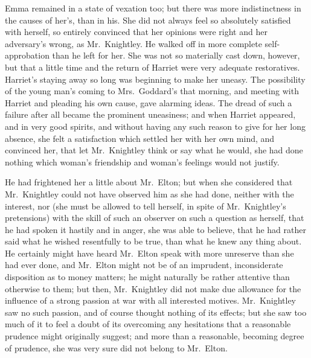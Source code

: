 Emma remained in a state of vexation too; but there was more
indistinctness in the causes of her's, than in his.  She did not always
feel so absolutely satisfied with herself, so entirely convinced that
her opinions were right and her adversary's wrong, as Mr.\ Knightley.
He walked off in more complete self-approbation than he left for her.
She was not so materially cast down, however, but that a little
time and the return of Harriet were very adequate restoratives.
Harriet's staying away so long was beginning to make her uneasy.
The possibility of the young man's coming to Mrs.\ Goddard's
that morning, and meeting with Harriet and pleading his own cause,
gave alarming ideas.  The dread of such a failure after all became the
prominent uneasiness; and when Harriet appeared, and in very good spirits,
and without having any such reason to give for her long absence,
she felt a satisfaction which settled her with her own mind,
and convinced her, that let Mr.\ Knightley think or say what he would,
she had done nothing which woman's friendship and woman's feelings
would not justify.

He had frightened her a little about Mr.\ Elton; but when she considered
that Mr.\ Knightley could not have observed him as she had done,
neither with the interest, nor (she must be allowed to tell herself,
in spite of Mr.\ Knightley's pretensions) with the skill of such
an observer on such a question as herself, that he had spoken it
hastily and in anger, she was able to believe, that he had rather
said what he wished resentfully to be true, than what he knew
any thing about.  He certainly might have heard Mr.\ Elton speak
with more unreserve than she had ever done, and Mr.\ Elton might not
be of an imprudent, inconsiderate disposition as to money matters;
he might naturally be rather attentive than otherwise to them;
but then, Mr.\ Knightley did not make due allowance for the influence
of a strong passion at war with all interested motives.  Mr.\ Knightley
saw no such passion, and of course thought nothing of its effects;
but she saw too much of it to feel a doubt of its overcoming any
hesitations that a reasonable prudence might originally suggest;
and more than a reasonable, becoming degree of prudence, she was very
sure did not belong to Mr.\ Elton.

